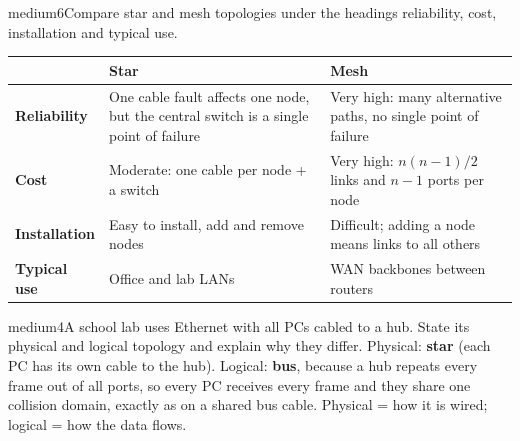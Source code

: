 \documentclass[10pt]{article}
\begin{document}
\begin{practice}{medium}{6}Compare star and mesh topologies under the headings reliability, cost, installation and typical use.
\sol
\begin{tabularx}{\linewidth}{@{}>{\bfseries}lXX@{}}
\toprule
 & Star & Mesh\\\midrule
Reliability & One cable fault affects one node, but the central switch is a single point of failure & Very high: many alternative paths, no single point of failure\\
Cost & Moderate: one cable per node + a switch & Very high: $n(n-1)/2$ links and $n-1$ ports per node\\
Installation & Easy to install, add and remove nodes & Difficult; adding a node means links to all others\\
Typical use & Office and lab LANs & WAN backbones between routers\\
\bottomrule
\end{tabularx}
\end{practice}

\begin{practice}{medium}{4}A school lab uses Ethernet with all PCs cabled to a hub. State its physical and logical topology and explain why they differ.
\sol Physical: \textbf{star} (each PC has its own cable to the hub). Logical: \textbf{bus}, because a hub repeats every frame out of all ports, so every PC receives every frame and they share one collision domain, exactly as on a shared bus cable. Physical = how it is wired; logical = how the data flows.
\end{practice}
\end{document}
